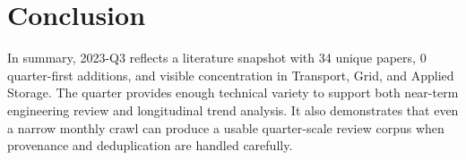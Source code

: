 \documentclass[conference]{IEEEtran}
\begin{document}
\section{Conclusion}
In summary, 2023-Q3 reflects a literature snapshot with 34 unique papers, 0 quarter-first additions, and visible concentration in Transport, Grid, and Applied Storage. The quarter provides enough technical variety to support both near-term engineering review and longitudinal trend analysis. It also demonstrates that even a narrow monthly crawl can produce a usable quarter-scale review corpus when provenance and deduplication are handled carefully.



\end{document}
